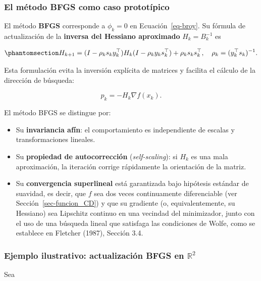 \documentclass[
  spanish,
  us-letterpaper,
]{scrreprt}
\providecommand{\tightlist}{%
  \setlength{\itemsep}{0pt}\setlength{\parskip}{0pt}}
\numberwithin{equation}{section}
\begin{document}
\subsubsection{El método BFGS como caso
prototípico}\label{el-muxe9todo-bfgs-como-caso-prototuxedpico}

El método \textbf{BFGS} corresponde a \(\phi_k = 0\) en
Ecuación~\ref{eq-broy}. Su fórmula de actualización de la
\textbf{inversa del Hessiano aproximado} \(H_k = B_k^{-1}\) es

\begin{equation}\phantomsection\label{eq-17}{
H_{k+1} = (I - \rho_k s_k y_k^\top) H_k (I - \rho_k y_k s_k^\top) + \rho_k s_k s_k^\top,
\quad \rho_k = (y_k^\top s_k)^{-1}. 
}\end{equation}

Esta formulación evita la inversión explícita de matrices y facilita el
cálculo de la dirección de búsqueda:

\[
p_k = -H_k \nabla f(x_k).
\]

El método BFGS se distingue por:

\begin{itemize}
\tightlist
\item
  Su \textbf{invariancia afín}: el comportamiento es independiente de
  escalas y transformaciones lineales.
\item
  Su \textbf{propiedad de autocorrección} (\emph{self-scaling}): si
  \(H_k\) es una mala aproximación, la iteración corrige rápidamente la
  orientación de la matriz.
\item
  Su \textbf{convergencia superlineal} está garantizada bajo hipótesis
  estándar de suavidad, es decir, que \(f\) sea dos veces continuamente
  diferenciable (ver Sección~\ref{sec-funcion_CD}) y que su gradiente
  (o, equivalentemente, su Hessiano) sea Lipschitz continuo en una
  vecindad del minimizador, junto con el uso de una búsqueda lineal que
  satisfaga las condiciones de Wolfe, como se establece en Fletcher
  (1987), Sección 3.4.
\end{itemize}

\subsubsection{\texorpdfstring{Ejemplo ilustrativo: actualización BFGS
en
\(\mathbb{R}^2\)}{Ejemplo ilustrativo: actualización BFGS en \textbackslash mathbb\{R\}\^{}2}}\label{ejemplo-ilustrativo-actualizaciuxf3n-bfgs-en-mathbbr2}

Sea
\end{document}
